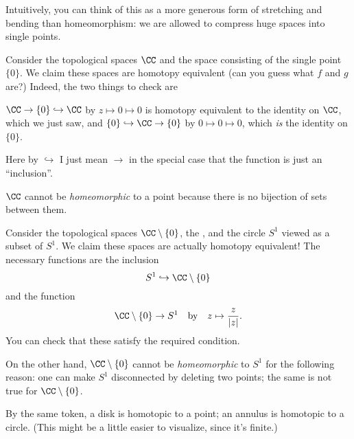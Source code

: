 Intuitively, you can think of this as a more generous form of stretching
and bending than homeomorphism: we are allowed to compress huge spaces into single points.

\begin{example}[$\CC$ is contractible]
	Consider the topological spaces $\CC$
	and the space consisting of the single point $\{0\}$. 
	We claim these spaces are homotopy equivalent (can you guess what $f$ and $g$ are?)
	Indeed, the two things to check are
	\begin{enumerate}[(i)]
		\ii $\CC \to \{0\} \hookrightarrow \CC$ by $z \mapsto 0 \mapsto 0$
		is homotopy equivalent to the identity on $\CC$, which we just saw, and
		\ii $\{0\} \hookrightarrow \CC \to \{0\}$ by $0 \mapsto 0 \mapsto 0$, which \emph{is} the identity on $\{0\}$.
	\end{enumerate}
	Here by $\hookrightarrow$ I just mean $\to$ in the special case
	that the function is just an ``inclusion''.
\end{example}
\begin{remark}
	$\CC$ cannot be \emph{homeomorphic} to a point
	because there is no bijection of sets between them.
\end{remark}

\begin{example}
	Consider the topological spaces $\CC \setminus \{0\}$,
	the , and the circle $S^1$ viewed as a subset of $S^1$.
	We claim these spaces are actually homotopy equivalent!
	The necessary functions are the inclusion
	\[ S^1 \hookrightarrow \CC \setminus \{0\} \]
	and the function
	\[ \CC \setminus \{0\} \to S^1
		\quad\text{by}\quad
		z \mapsto \frac{z}{\left\lvert z \right\rvert}. \]
	You can check that these satisfy the required condition.
\end{example}
\begin{remark}
	On the other hand, $\CC \setminus \{0\}$ cannot be \emph{homeomorphic} to $S^1$
	for the following reason:
	one can make $S^1$ disconnected by deleting two points;
	the same is not true for $\CC \setminus \{0\}$.
\end{remark}
\begin{example}
	[$\text{Disk} = \text{Point}$, $\text{Annulus} = \text{Circle}$.]
	By the same token, a disk is homotopic to a point;
	an annulus is homotopic to a circle.
	(This might be a little easier to visualize, since it's finite.)
\end{example}

